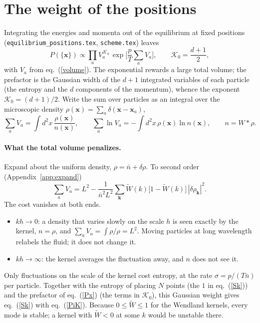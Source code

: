 \documentclass[11pt,aps,preprint,nofootinbib,superscriptaddress,tightenlines]{revtex4-2}
\def\st{\begin{equation}}
\def\stp{\end{equation}}
\def\Eq#1{eq.~(\ref{#1})}
\def\App#1{Appendix~\ref{#1}}
\let\oldparagraph\paragraph
\renewcommand{\paragraph}{\par\bigskip\oldparagraph}
\begin{document}
\section{The weight of the positions}
\label{sec:weight}

Integrating the energies and momenta out of the equilibrium at fixed positions (\texttt{equilibrium\_positions.tex}, \texttt{scheme.tex})
leaves
\st
P(\{\bm x\})\propto\prod_aV_a^{\mathcal K_0}\,\exp\Big[\frac pT\sum_aV_a\Big],\qquad \mathcal K_0=\frac{d+1}2,
\label{Px}
\stp
with $V_a$ from \Eq{volume}.  The exponential rewards a large total volume; the prefactor is the Gaussian width of the $d+1$ integrated
variables of each particle (the entropy and the $d$ components of the momentum), whence the exponent $\mathcal K_0=(d+1)/2$.  Write the sum over particles as an integral over the microscopic density $\rho(\bm x)=\sum_a\delta(\bm x-\bm x_a)$,
\st
\sum_aV_a=\int d^2x\,\frac{\rho(\bm x)}{n(\bm x)},\qquad \sum_a\ln V_a=-\int d^2x\,\rho(\bm x)\ln n(\bm x),\qquad n=W*\rho .
\label{functional}
\stp

\paragraph{What the total volume penalizes.}  Expand about the uniform density, $\rho=\bar n+\delta\rho$.  To second order (\App{app:expand})
\st
\sum_aV_a=L^2-\frac1{\bar n^2L^2}\sum_{\bm k}\widetilde W(k)\big[1-\widetilde W(k)\big]\,|\delta\rho_{\bm k}|^2 .
\label{V2}
\stp
The cost vanishes at both ends.
\begin{itemize}
\item $kh\to0$: a density that varies slowly on the scale $h$ is seen exactly by the kernel, $n=\rho$, and $\sum_aV_a=\int\rho/\rho=L^2$.
  Moving particles at long wavelength relabels the fluid; it does not change it.
\item $kh\to\infty$: the kernel averages the fluctuation away, and $n$ does not see it.
\end{itemize}
Only fluctuations on the scale of the kernel cost entropy, at the rate $\sigma=p/(T\bar n)$ per particle.  Together with the entropy of placing $N$
points (the $1$ in \Eq{Sk}) and the prefactor of \Eq{Px} (the terms in $\mathcal K_0$), this Gaussian weight gives \Eq{Sk} with \Eq{PiK}.  Because
$0\le\widetilde W\le1$ for the Wendland kernels, every mode is stable; a kernel with $\widetilde W<0$ at some $k$ would be unstable there.
\end{document}
